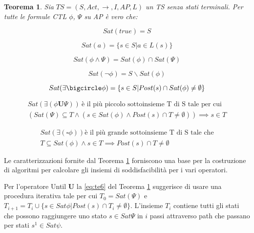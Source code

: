 \documentclass[a4paper, 10pt]{article}
\newtheorem{theor}{Teorema}[section]
\numberwithin{equation}{theor}
\begin{document}
\begin{theor}
\label{eq:teoremaCaratterizzazione}
Sia $TS = (S, Act, \rightarrow, I, AP, L)$ un \ac{TS} senza stati terminali. Per tutte le formule \ac{CTL} $\phi$, $\Psi$ su AP è vero che:

\begin{equation}\label{eq:te1}
Sat(true) = S
\end{equation}

\begin{equation}\label{eq:te2}
Sat(a) = \{s \in S | a \in L(s)\}
\end{equation}

\begin{equation}\label{eq:te3}
Sat( \phi \wedge \Psi) = Sat(\phi)  \cap Sat(\Psi)
\end{equation}

\begin{equation}\label{eq:te4}
Sat(\neg \phi) = S \backslash Sat(\phi)
\end{equation}

\begin{equation}\label{eq:te5}
Sat(\exists\bigcircle\phi) = \{s \in S | Post(s) \cap Sat(\phi) \neq \emptyset\}
\end{equation}

\begin{equation}\label{eq:te6}
\begin{aligned}
Sat(\exists(\phi \boldsymbol{U} \Psi))\ \text{è il più piccolo sottoinsieme T di S tale per cui } \\
(Sat(\Psi) \subseteq T \wedge (s \in Sat(\phi) \wedge Post(s) \cap T \neq \emptyset)) \implies s \in T
\end{aligned}
\end{equation}

\begin{equation}\label{eq:te7}
\begin{aligned}
Sat(\exists(\square\phi)) \text{è il più grande sottoinsieme T di S tale che} \\ 
T \subseteq Sat (\phi) \wedge s \in T \implies Post(s) \cap T \neq \emptyset
\end{aligned}
\end{equation}
\end{theor}



Le caratterizzazioni fornite dal Teorema \ref{eq:teoremaCaratterizzazione} forniscono una base per la costruzione di algoritmi per calcolare gli insiemi di soddisfacibilità per i vari operatori. \par
Per l'operatore Until $\boldsymbol{U}$ la \eqref{eq:te6} del Teorema \ref{eq:teoremaCaratterizzazione} suggerisce di usare una procedura iterativa tale per cui $T_{0} = Sat(\Psi)$ e $T_{i+1} = T_{i} \cup \{s \in Sat{\phi} | Post(s) \cap T_{i} \neq \emptyset \}$. L'insieme $T_{i}$ contiene tutti gli stati che possono raggiungere uno stato $s \in Sat{\Psi}$ in $i$ passi attraverso path che passano per stati $s^{1} \in Sat{\psi}$.
\end{document}
